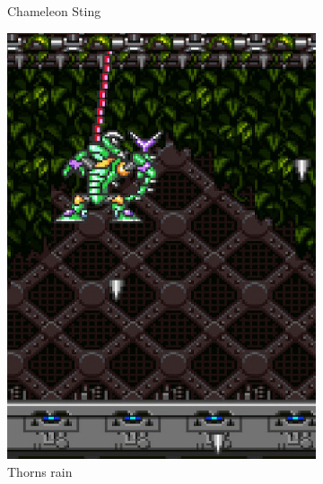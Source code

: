 \begin{figure}[htp]
\begin{subfigure}[t]{0.32\linewidth}
		\caption{Chameleon Sting}
	\end{subfigure}
	\begin{subfigure}[t]{0.26\linewidth}
		\centering
		\includegraphics[width=\linewidth]{figures/X1/Sting_chameleon/Chameleon_spike_fall.jpg}
		\caption{Thorns rain}
	\end{subfigure}
	\begin{subfigure}[t]{0.27\linewidth}
		\centering

\end{subfigure}
\end{figure}

